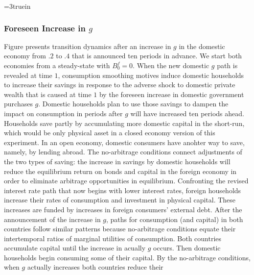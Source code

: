 \centerline{\epsfxsize=3truein}
\caption{Response to  increase in domestic $g$ at time $10$ foreseen at time $1$.
From left to right, top to bottom: $k, c, \bar R, x, g, B^f$. The dashed-dotted  line is the original
steady state in the domestic country.  The dashed line denotes the foreign country.}
\endfigure





\subsubsection{Foreseen Increase in $g$}

Figure  presents  transition dynamics after an increase in $g$   in the
domestic economy from $.2$ to $.4$ that is announced ten periods in advance. We start both economies
 from a steady-state with $B_{0}^f = 0$. When the new domestic $g$ path  is
revealed  at time $1$, consumption smoothing motives induce domestic households to increase
their savings in response to the  adverse shock to domestic private
wealth that is caused at time $1$ by the foreseen increase
in domestic government purchases $g$.  Domestic households plan to  use those savings to  dampen the impact on
consumption in periods after $g$ will have increased ten periods ahead. Households  save partly by accumulating more
domestic capital in the short-run,  which would be  only physical asset in a closed economy version of this experiment.
 In an open economy, domestic consumers  have anohter  way to save, namely,  by lending abroad.
 The no-arbitrage conditions connect adjustments of the two types of saving: the   increase
   in
savings  by domestic households will reduce the equilibrium return
on bonds and capital in the foreign economy in order to eliminate  arbitrage
opportunities in equilibrium. Confronting  the revised  interest rate path that now begins with lower
interest rates, foreign households increase their rates of consumption and
investment in physical capital. These increases  are funded
by  increases in foreign consumers' external debt. After the announcement of
the increase in $g$,  paths for consumption (and capital) in both countries follow
similar  patterns because no-arbitrage conditions equate their intertemporal  ratios of marginal utilities of consumption.
 Both countries  accumulate capital until the
increase in acually $g$ occurs. Then   domestic households begin consuming some of their
 capital. By the  no-arbitrage conditions,  when  $g$  actually  increases both countries reduce their
